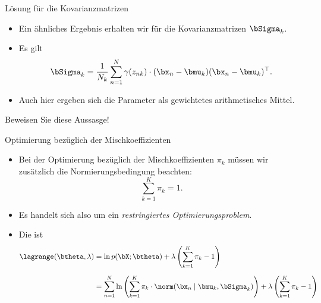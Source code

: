 \begin{frame}{Lösung für die Kovarianzmatrizen}{}
	\begin{itemize}
		\item Ein ähnliches Ergebnis erhalten wir für die Kovarianzmatrizen $\bSigma_k$.
		\item Es gilt
		\begin{equation} \label{eq:gmm-update-cov}
			\bSigma_k = \frac{1}{N_k} \sum_{n=1}^N \gamma(z_{nk}) \cdot (\bx_n - \bmu_k) (\bx_n - \bmu_k)^\top.
		\end{equation}
		\item Auch hier ergeben sich die Parameter als gewichtetes arithmetisches Mittel.
	\end{itemize}
	
	\begin{mytask}
		Beweisen Sie diese Aussasge!
	\end{mytask}
\end{frame}


\begin{frame}{Optimierung bezüglich der Mischkoeffizienten}{}
	\begin{itemize}
		\item Bei der Optimierung bezüglich der Mischkoeffizienten $\pi_k$ müssen wir zusätzlich die Normierungsbedingung beachten:
			$$\sum_{k=1}^K \pi_k = 1.$$
		\item Es handelt sich also um ein \textit{restringiertes Optimierungsproblem}.
		\item Die  ist
		\begin{equation} \label{eq:gmm-mixing-lagrange}
			\begin{aligned}
				\lagrange(\btheta, \lambda)
					&= \ln p(\bX; \btheta) + \lambda\left( \sum_{k=1}^K \pi_k - 1 \right)
			\\[2mm]
					&= \sum_{n=1}^N \ln\left( \sum_{k=1}^K \pi_k \cdot \norm(\bx_n \mid \bmu_k, \bSigma_k) \right)
						+ \lambda\left( \sum_{k=1}^K \pi_k - 1 \right)
			\end{aligned}
		\end{equation}
	\end{itemize}
\end{frame}


